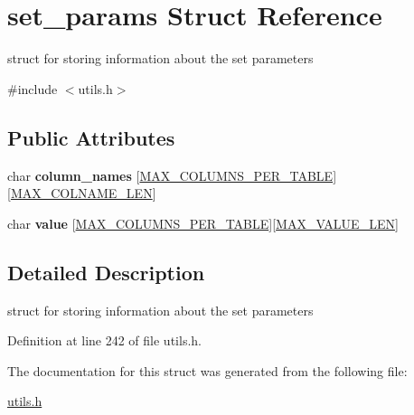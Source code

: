 \hypertarget{structset__params}{\section{set\-\_\-params Struct Reference}
\label{structset__params}
}


struct for storing information about the set parameters  




{\ttfamily \#include $<$utils.\-h$>$}

\subsection*{Public Attributes}
\begin{DoxyCompactItemize}
\item 
\hypertarget{structset__params_af228d5799b6f160a7c0716b622cbf43c}{char {\bfseries column\-\_\-names} \mbox{[}\hyperlink{storage_8h_a2c806bc7de304d1d07bb12c9d58dbdd1}{M\-A\-X\-\_\-\-C\-O\-L\-U\-M\-N\-S\-\_\-\-P\-E\-R\-\_\-\-T\-A\-B\-L\-E}\mbox{]}\mbox{[}\hyperlink{storage_8h_a5cced553ee7679aebe25952d79c7b86b}{M\-A\-X\-\_\-\-C\-O\-L\-N\-A\-M\-E\-\_\-\-L\-E\-N}\mbox{]}}\label{structset__params_af228d5799b6f160a7c0716b622cbf43c}

\item 
\hypertarget{structset__params_aedff9349b166fc37dd16122229c3526c}{char {\bfseries value} \mbox{[}\hyperlink{storage_8h_a2c806bc7de304d1d07bb12c9d58dbdd1}{M\-A\-X\-\_\-\-C\-O\-L\-U\-M\-N\-S\-\_\-\-P\-E\-R\-\_\-\-T\-A\-B\-L\-E}\mbox{]}\mbox{[}\hyperlink{storage_8h_a00a29850f2b5b985f776f864d83e5ac3}{M\-A\-X\-\_\-\-V\-A\-L\-U\-E\-\_\-\-L\-E\-N}\mbox{]}}\label{structset__params_aedff9349b166fc37dd16122229c3526c}

\end{DoxyCompactItemize}


\subsection{Detailed Description}
struct for storing information about the set parameters 

Definition at line 242 of file utils.\-h.



The documentation for this struct was generated from the following file\-:\begin{DoxyCompactItemize}
\item 
\hyperlink{utils_8h}{utils.\-h}\end{DoxyCompactItemize}
